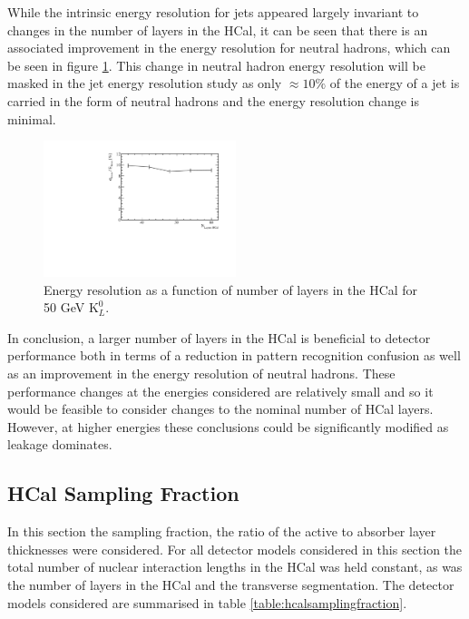 While the intrinsic energy resolution for jets appeared largely invariant to changes in the number of layers in the HCal, it can be seen that there is an associated improvement in the energy resolution for neutral hadrons, which can be seen in figure \ref{fig:hcalnfixedlayerser}.  This change in neutral hadron energy resolution will be masked in the jet energy resolution study as only $\approx 10\%$ of the energy of a jet is carried in the form of neutral hadrons and the energy resolution change is minimal.   

\begin{figure}
\centering
\includegraphics[width=0.5\textwidth]{OptimisationStudies/Plots/EnergyResolution/ER_vs_HCalNFixedLayers_50GeVKaon0L.pdf}
\caption[Energy resolution as a function of number of layers in the HCal for 50 GeV $\text{K}^{0}_{L}$.]{Energy resolution as a function of number of layers in the HCal  for 50 GeV $\text{K}^{0}_{L}$.}
\label{fig:hcalnfixedlayerser}
\end{figure}

In conclusion, a larger number of layers in the HCal is beneficial to detector performance both in terms of a reduction in pattern recognition confusion as well as an improvement in the energy resolution of neutral hadrons.  These performance changes at the energies considered are relatively small and so it would be feasible to consider changes to the nominal number of HCal layers.  However, at higher energies these conclusions could be significantly modified as leakage dominates.  


\subsection{HCal Sampling Fraction}
\label{sec:hcalsamplingfraction}
In this section the sampling fraction, the ratio of the active to absorber layer thicknesses were considered.  For all detector models considered in this section the total number of nuclear interaction lengths in the HCal was held constant, as was the number of layers in the HCal and the transverse segmentation.  The detector models considered are summarised in table \ref{table:hcalsamplingfraction}. 

